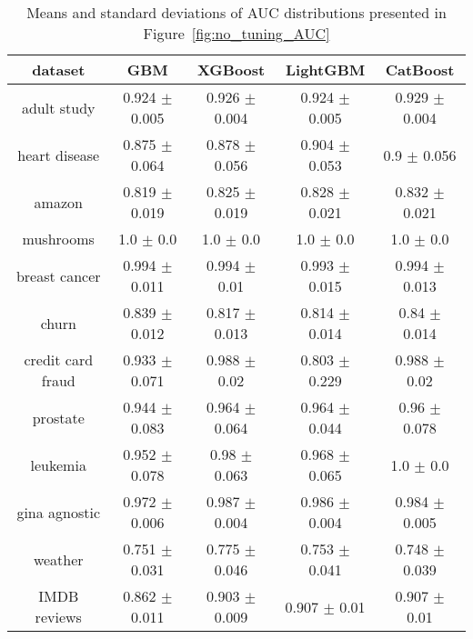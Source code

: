 \documentclass[magisterska, english]{pwr_wmat_praca_dyplomowa}
\theoremstyle{plain}
\numberwithin{theorem}{chapter}
\theoremstyle{definition}
\numberwithin{theorem}{chapter}
\begin{document}
\begin{table}[h!]
\centering
\begin{tabular}{|c|c|c|c|c|}
\hline
\textbf{dataset}  & \textbf{GBM}  & \textbf{XGBoost}  & \textbf{LightGBM}  & \textbf{CatBoost} \\ \hline
adult study & \cellcolor{red}0.924 $\pm$ 0.005 & 0.926 $\pm$ 0.004 & \cellcolor{red}0.924 $\pm$ 0.005 & \cellcolor{green}0.929 $\pm$ 0.004\\ \hline
heart disease & \cellcolor{red}0.875 $\pm$ 0.064 & 0.878 $\pm$ 0.056 & \cellcolor{green}0.904 $\pm$ 0.053 & 0.9 $\pm$ 0.056\\ \hline
amazon & \cellcolor{red}0.819 $\pm$ 0.019 & 0.825 $\pm$ 0.019 & 0.828 $\pm$ 0.021 & \cellcolor{green}0.832 $\pm$ 0.021\\ \hline
mushrooms & 1.0 $\pm$ 0.0 & 1.0 $\pm$ 0.0 & 1.0 $\pm$ 0.0 & 1.0 $\pm$ 0.0\\ \hline
breast cancer & 0.994 $\pm$ 0.011 & \cellcolor{green}0.994 $\pm$ 0.01 & \cellcolor{red}0.993 $\pm$ 0.015 & 0.994 $\pm$ 0.013\\ \hline
churn & 0.839 $\pm$ 0.012 & 0.817 $\pm$ 0.013 & \cellcolor{red}0.814 $\pm$ 0.014 & \cellcolor{green}0.84 $\pm$ 0.014\\ \hline
credit card fraud & 0.933 $\pm$ 0.071 & \cellcolor{green}0.988 $\pm$ 0.02 & \cellcolor{red}0.803 $\pm$ 0.229 & \cellcolor{green}0.988 $\pm$ 0.02\\ \hline
prostate & \cellcolor{red}0.944 $\pm$ 0.083 & 0.964 $\pm$ 0.064 & \cellcolor{green}0.964 $\pm$ 0.044 & 0.96 $\pm$ 0.078\\ \hline
leukemia & \cellcolor{red}0.952 $\pm$ 0.078 & 0.98 $\pm$ 0.063 & 0.968 $\pm$ 0.065 & \cellcolor{green}1.0 $\pm$ 0.0\\ \hline
gina agnostic & \cellcolor{red}0.972 $\pm$ 0.006 & \cellcolor{green}0.987 $\pm$ 0.004 & 0.986 $\pm$ 0.004 & 0.984 $\pm$ 0.005\\ \hline
weather & 0.751 $\pm$ 0.031 & \cellcolor{green}0.775 $\pm$ 0.046 & 0.753 $\pm$ 0.041 & \cellcolor{red}0.748 $\pm$ 0.039\\ \hline
IMDB reviews & \cellcolor{red}0.862 $\pm$ 0.011 & 0.903 $\pm$ 0.009 & \cellcolor{green}0.907 $\pm$ 0.01 & \cellcolor{green}0.907 $\pm$ 0.01\\ \hline
\end{tabular}
\caption{Means and standard deviations of AUC distributions presented in Figure~\ref{fig:no_tuning_AUC}}
\label{tab:no_tuning_AUC}
\end{table}
\end{document}
